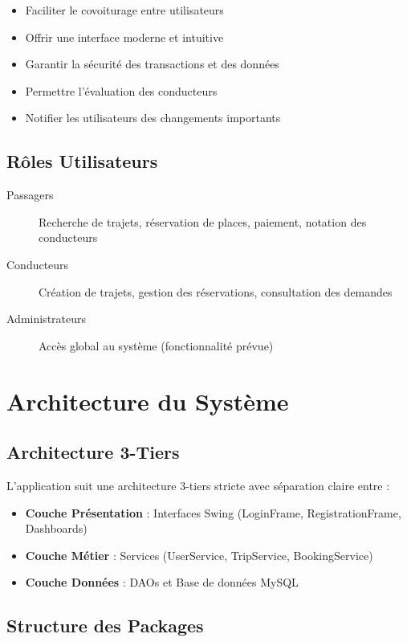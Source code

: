 \documentclass[12pt,a4paper]{report}
\begin{document}
\begin{itemize}[leftmargin=*]
    \item Faciliter le covoiturage entre utilisateurs
    \item Offrir une interface moderne et intuitive
    \item Garantir la sécurité des transactions et des données
    \item Permettre l'évaluation des conducteurs
    \item Notifier les utilisateurs des changements importants
\end{itemize}

\section{Rôles Utilisateurs}

\begin{description}
    \item[Passagers] Recherche de trajets, réservation de places, paiement, notation des conducteurs
    \item[Conducteurs] Création de trajets, gestion des réservations, consultation des demandes
    \item[Administrateurs] Accès global au système (fonctionnalité prévue)
\end{description}

\chapter{Architecture du Système}

\section{Architecture 3-Tiers}

L'application suit une architecture 3-tiers stricte avec séparation claire entre :

\begin{itemize}
    \item \textbf{Couche Présentation} : Interfaces Swing (LoginFrame, RegistrationFrame, Dashboards)
    \item \textbf{Couche Métier} : Services (UserService, TripService, BookingService)
    \item \textbf{Couche Données} : DAOs et Base de données MySQL
\end{itemize}

\section{Structure des Packages}
\end{document}
